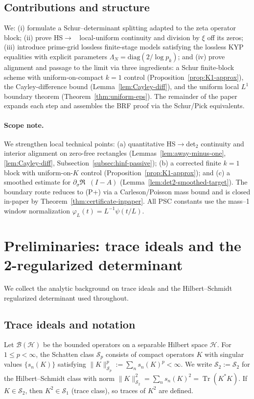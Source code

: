 \documentclass[11pt]{article}
\theoremstyle{definition}
\theoremstyle{remark}
\newcommand{\HS}{\mathcal{S}_2}
\DeclareMathOperator{\Tr}{Tr}
\DeclareMathOperator{\dettwo}{det_2}
\begin{document}
\subsection*{Contributions and structure}
We: (i) formulate a Schur--determinant splitting adapted to the zeta operator block; (ii) prove HS\(\to\)\(\dettwo\) local-uniform continuity and division by \(\xi\) off its zeros; (iii) introduce prime-grid lossless finite-stage models satisfying the lossless KYP equalities with explicit parameters \(\Lambda_N=\mathrm{diag}(2/\log p_k)\); and (iv) prove alignment and passage to the limit via three ingredients: a Schur finite-block scheme with uniform-on-compact $k=1$ control (Proposition~\ref{prop:K1-approx}), the Cayley-difference bound (Lemma~\ref{lem:Cayley-diff}), and the uniform local \(L^1\) boundary theorem (Theorem~\ref{thm:uniform-eps}). The remainder of the paper expands each step and assembles the BRF proof via the Schur/Pick equivalents.
\paragraph{Scope note.} We strengthen local technical points: (a) quantitative HS$\to$det$_2$ continuity and interior alignment on zero-free rectangles (Lemmas~\ref{lem:away-minus-one}, \ref{lem:Cayley-diff}, Subsection~\ref{subsec:hinf-passive}); (b) a corrected finite $k{=}1$ block with uniform-on-$K$ control (Proposition~\ref{prop:K1-approx}); and (c) a smoothed estimate for $\partial_\sigma\Re\dettwo(I-A)$ (Lemma~\ref{lem:det2-smoothed-target}). The boundary route reduces to (P+) via a Carleson/Poisson mass bound and is closed in-paper by Theorem~\ref{thm:certificate-inpaper}. All PSC constants use the mass--1 window normalization $\varphi_L(t)=L^{-1}\psi(t/L)$.

\section{Preliminaries: trace ideals and the 2-regularized determinant}
We collect the analytic background on trace ideals and the Hilbert--Schmidt regularized determinant used throughout.

\subsection{Trace ideals and notation}
Let \(\mathcal{B}(\mathcal{H})\) be the bounded operators on a separable Hilbert space \(\mathcal{H}\). For \(1\le p<\infty\), the Schatten class \(\mathcal{S}_p\) consists of compact operators \(K\) with singular values \(\{s_n(K)\}\) satisfying \(\|K\|_{\mathcal{S}_p}^p:=\sum_n s_n(K)^p<\infty\). We write \(\HS:=\mathcal{S}_2\) for the Hilbert--Schmidt class with norm \(\|K\|_{\HS}^2=\sum_n s_n(K)^2=\Tr(K^*K)\). If \(K\in\HS\), then \(K^2\in \mathcal{S}_1\) (trace class), so traces of \(K^2\) are defined.
\end{document}
